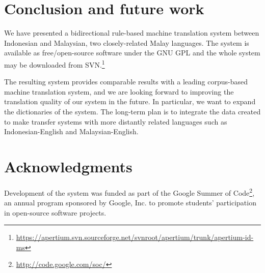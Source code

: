 \documentclass[10pt,a5paper,twoside]{article}
\begin{document}
\section*{Conclusion and future work}
We have presented a bidirectional rule-based machine translation system between Indonesian and Malaysian, two closely-related Malay languages. The system is available as free/open-source software under the GNU GPL and the whole system may be downloaded from SVN.\footnote{\url{https://apertium.svn.sourceforge.net/svnroot/apertium/trunk/apertium-id-ms}}

The resulting system provides comparable results with a leading corpus-based machine translation system, and we are looking forward to improving the translation quality of our system in the future. In particular, we want to expand the dictionaries of the system. The long-term plan is to integrate the data created to make transfer systems with more distantly related languages such as Indonesian-English and Malaysian-English.

\section*{Acknowledgments}
Development of the system was funded as part of the Google Summer of Code\footnote{\url{http://code.google.com/soc/}}, an annual program sponsored by Google, Inc. to promote students' participation in open-source software projects.




\nocite{lewis09}
\end{document}

